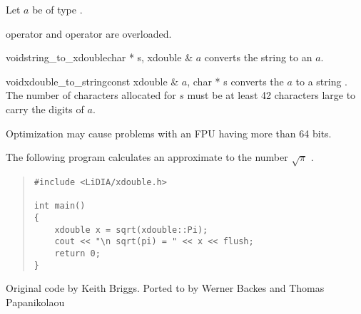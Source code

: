 
\IO

Let $a$ be of type .

 operator \code{>>} and  operator \code{<<} are overloaded.

\begin{fcode}{void}{string_to_xdouble}{char * s, xdouble & $a$}
  converts the string  to an  $a$.
\end{fcode}

\begin{fcode}{void}{xdouble_to_string}{const xdouble & $a$, char * s}
  converts the  $a$ to a string .  The number of characters allocated for
  $s$ must be at least 42 characters large to carry the digits of $a$.
\end{fcode}



\SEEALSO




\NOTES

Optimization may cause problems with an FPU having more than 64 bits.



\EXAMPLES

The following program calculates an approximate to the number $\sqrt{\pi}$ .

\begin{quote}
\begin{verbatim}
#include <LiDIA/xdouble.h>

int main()
{
    xdouble x = sqrt(xdouble::Pi);
    cout << "\n sqrt(pi) = " << x << flush;
    return 0;
}
\end{verbatim}
\end{quote}



\AUTHOR

Original code by Keith Briggs.  Ported to \LiDIA by Werner Backes and Thomas Papanikolaou
